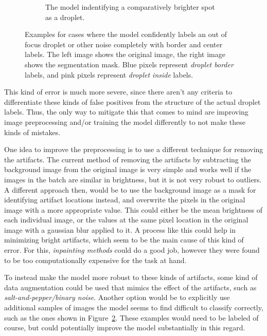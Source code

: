 \begin{figure}[htbp]
\begin{subfigure}{\textwidth}
{\begin{tabular}{ll}
            \end{tabular}
        }
        \caption{The model indentifying a comparatively brighter spot as a droplet.}
        \label{fig:totally_wrong_b}
    \end{subfigure}
    \vspace{0.2cm}
    \caption{Examples for cases where the model confidently labels an out of focus droplet or other noise completely with border and center labels. The left image shows the original image, the right image shows the segmentation mask. Blue pixels represent \emph{droplet border} labels, and pink pixels represent \emph{droplet inside} labels.}
    \label{fig:totally_wrong}
\end{figure}

This kind of error is much more severe, since there aren't any criteria to differentiate these kinds of false positives from the structure of the actual droplet labels.
Thus, the only way to mitigate this that comes to mind are improving image preprocessing and/or training the model differently to not make these kinds of mistakes.

One idea to improve the preprocessing is to use a different technique for removing the artifacts. 
The current method of removing the artifacts by subtracting the background image from the original image is very simple and works well if the images in the batch are similar in brightness, but it is not very robust to outliers.
A different approach then, would be to use the background image as a mask for identifying artifact locations instead, and overwrite the pixels in the original image with a more appropriate value. 
This could either be the mean brightness of each individual image, or the values at the same pixel location in the original image with a gaussian blur applied to it.
A process like this could help in minimizing bright artifacts, which seem to be the main cause of this kind of error.
For this, \emph{inpainting methods} \cite{OpenCVImageInpainting,teleaImageInpaintingTechnique2004,bertalmioNavierstokesFluidDynamics2001} could do a good job, however they were found to be too computationally expensive for the task at hand.

To instead make the model more robust to these kinds of artifacts, some kind of data augmentation could be used that mimics the effect of the artifacts, such as \emph{salt-and-pepper/binary noise}. Another option would be to explicitly use additional samples of images the model seems to find difficult to classify correctly, such as the ones shown in Figure~\ref{fig:totally_wrong}. These examples would need to be labeled of course, but could potentially improve the model substantially in this regard.

